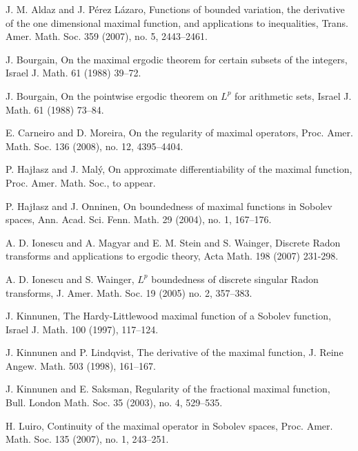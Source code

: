 \documentclass[reqno]{amsart}
\theoremstyle{definition}
\theoremstyle{remark}
\numberwithin{equation}{section}
\begin{document}

\begin{thebibliography}{99}

J. M. Aldaz and J. P\'{e}rez L\'{a}zaro, 
\newblock Functions of bounded variation, the derivative of the one dimensional maximal function, and applications to inequalities,
\newblock Trans. Amer. Math. Soc. 359 (2007), no. 5, 2443--2461.

J. Bourgain,
\newblock On the maximal ergodic theorem for certain subsets of the integers,
\newblock Israel J. Math. 61 (1988) 39--72.


J. Bourgain, 
\newblock On the pointwise ergodic theorem on ${L}^p$ for arithmetic sets,
\newblock Israel J. Math. 61 (1988) 73--84.

 

E. Carneiro and D. Moreira, 
\newblock On the regularity of maximal operators,
\newblock Proc. Amer. Math. Soc. 136 (2008), no. 12, 4395--4404.


P. Haj\l asz and J. Mal\'{y}, 
\newblock On approximate differentiability of the maximal function,
\newblock Proc. Amer. Math. Soc., to appear.

P. Haj\l asz and J. Onninen, 
\newblock On boundedness of maximal functions in Sobolev spaces,
\newblock Ann. Acad. Sci. Fenn. Math. 29 (2004),  no. 1, 167--176.


 A. D. Ionescu and A. Magyar and E. M. Stein and S. Wainger,
 \newblock	Discrete {R}adon transforms and applications to ergodic theory,
 \newblock Acta Math. 198 (2007) 231-298.
 
 
A. D. Ionescu and S. Wainger,
\newblock ${L}^p$ boundedness of discrete singular {R}adon transforms,
\newblock J. Amer. Math. Soc. 19 (2005) no. 2, 357--383.


J. Kinnunen, 
\newblock The Hardy-Littlewood maximal function of a Sobolev function,
\newblock Israel J. Math. 100 (1997), 117--124.

J. Kinnunen and P. Lindqvist, 
\newblock The derivative of the maximal function,
\newblock J. Reine Angew. Math. 503 (1998), 161--167.

J. Kinnunen and E. Saksman,
\newblock Regularity of the fractional maximal function,
\newblock Bull. London Math. Soc. 35 (2003), no. 4, 529--535. 

H. Luiro, 
\newblock Continuity of the maximal operator in Sobolev spaces,
\newblock Proc. Amer. Math. Soc. 135 (2007), no. 1, 243--251.


\end{thebibliography}
\end{document}
